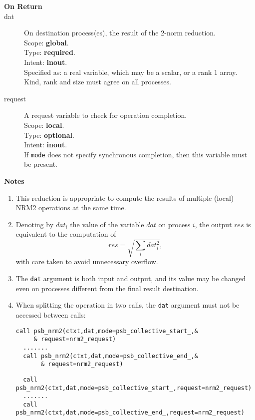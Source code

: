 \begin{description}
\item[\bf On Return]
\item[dat] On destination process(es), the result of the 2-norm reduction.\\
Scope: {\bf global}.\\
Type: {\bf required}.\\
Intent: {\bf inout}.\\
Specified as: a real variable, which may be a
scalar, or a rank 1 array. \\
Kind, rank and size must agree on all processes.
\item[request] A request variable to check for operation completion.\\
Scope: {\bf local}.\\
Type: {\bf optional}.\\
Intent: {\bf inout}.\\
If \verb|mode| does not specify synchronous completion, then this
variable must be present.
\end{description}


{\par\noindent\large\bfseries Notes}
\begin{enumerate}
\item This reduction is appropriate to compute the results of multiple
  (local) NRM2 operations at the same time. 
\item Denoting by $dat_i$ the value of the variable $dat$ on process
  $i$, the output $res$ is equivalent to the computation of
  \[ res = \sqrt{\sum_i dat_i^2},\]
  with care taken to avoid unnecessary overflow.
\item The \verb|dat| argument is both input and output, and its
  value may be changed even on processes different from the final
  result destination.
\item When splitting the operation in two calls, the \verb|dat|
  argument  must not be accessed between calls:
\ifpdf
\begin{verbatim}
call psb_nrm2(ctxt,dat,mode=psb_collective_start_,&
     & request=nrm2_request)
  .......
  call psb_nrm2(ctxt,dat,mode=psb_collective_end_,&
       & request=nrm2_request)
\end{verbatim}
\else
\begin{center}
    \begin{minipage}[tl]{0.9\textwidth}
\begin{verbatim} 
  call psb_nrm2(ctxt,dat,mode=psb_collective_start_,request=nrm2_request)
  .......
  call psb_nrm2(ctxt,dat,mode=psb_collective_end_,request=nrm2_request)
\end{verbatim}
    \end{minipage}
  \end{center}
\fi
\end{enumerate}



